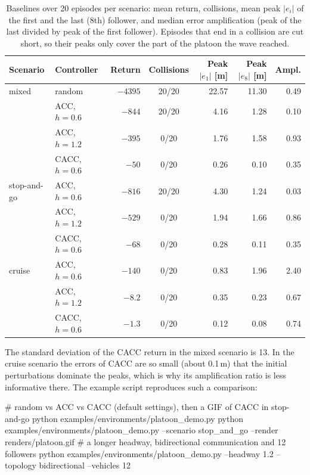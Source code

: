 \begin{table}[htbp]
  \centering\small
  \caption{Baselines over 20 episodes per scenario: mean return, collisions,
    mean peak $|e_i|$ of the first and the last (8th) follower, and median
    error amplification (peak of the last divided by peak of the first
    follower). Episodes that end in a collision are cut short, so their peaks
    only cover the part of the platoon the wave reached.}
  \label{tab:platoon-baselines}
  \begin{tabular}{@{}llrcrrr@{}}
    \toprule
    Scenario & Controller & Return & Collisions & Peak $|e_1|$ [m] & Peak $|e_8|$ [m] & Ampl. \\
    \midrule
    mixed       & random           & $-4395$ & 20/20 & 22.57 & 11.30 & 0.49 \\
                & ACC, $h = 0.6$   & $-844$  & 20/20 & 4.16 & 1.28 & 0.10 \\
                & ACC, $h = 1.2$   & $-395$  & 0/20  & 1.76 & 1.58 & 0.93 \\
                & CACC, $h = 0.6$  & $-50$   & 0/20  & 0.26 & 0.10 & 0.35 \\
    \midrule
    stop-and-go & ACC, $h = 0.6$   & $-816$  & 20/20 & 4.30 & 1.24 & 0.03 \\
                & ACC, $h = 1.2$   & $-529$  & 0/20  & 1.94 & 1.66 & 0.86 \\
                & CACC, $h = 0.6$  & $-68$   & 0/20  & 0.28 & 0.11 & 0.35 \\
    \midrule
    cruise      & ACC, $h = 0.6$   & $-140$  & 0/20  & 0.83 & 1.96 & 2.40 \\
                & ACC, $h = 1.2$   & $-8.2$  & 0/20  & 0.35 & 0.23 & 0.67 \\
                & CACC, $h = 0.6$  & $-1.3$  & 0/20  & 0.12 & 0.08 & 0.74 \\
    \bottomrule
  \end{tabular}
\end{table}

The standard deviation of the CACC return in the mixed scenario is 13. In the
cruise scenario the errors of CACC are so small (about 0.1\,m) that the initial
perturbations dominate the peaks, which is why its amplification ratio is less
informative there. The example script reproduces such a comparison:

\begin{shellcode}
# random vs ACC vs CACC (default settings), then a GIF of CACC in stop-and-go
python examples/environments/platoon_demo.py
python examples/environments/platoon_demo.py --scenario stop_and_go --render renders/platoon.gif
# a longer headway, bidirectional communication and 12 followers
python examples/environments/platoon_demo.py --headway 1.2 --topology bidirectional --vehicles 12
\end{shellcode}

